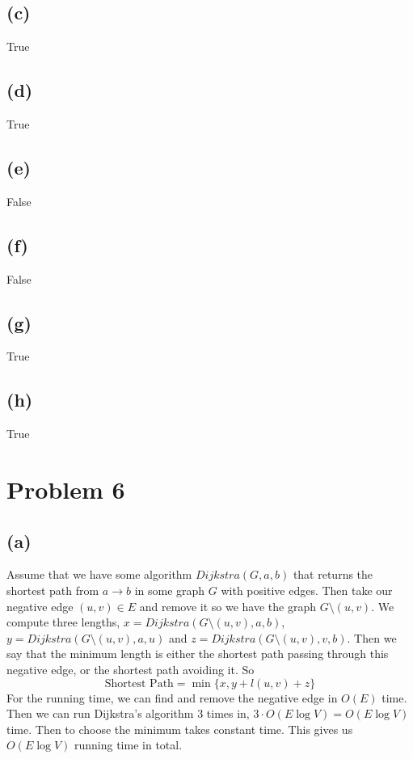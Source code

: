 \documentclass{article}
\theoremstyle{definition}
\begin{document}
\subsection*{(c)}
True
\subsection*{(d)}
True
\subsection*{(e)}
False
\subsection*{(f)}
False
\subsection*{(g)}
True 
\subsection*{(h)}
True
\section*{Problem 6}
\subsection*{(a)}
Assume that we have some algorithm $Dijkstra(G,a,b)$ that returns the shortest path from $a \rightarrow b$ in 
some graph $G$ with positive edges. Then take our negative edge $(u,v) \in E$ and remove it so we have the graph $G \setminus (u,v)$.
We compute three lengths, $x = Dijkstra(G \setminus (u,v), a,b)$, $y = Dijkstra(G \setminus (u,v), a, u)$ and $z = Dijkstra(G \setminus (u,v), v, b)$.
Then we say that the minimum length is either the shortest path passing through this negative edge, or the shortest path avoiding it.
So 
\[
    \text{Shortest Path} = \min\{x,y + l(u,v) + z\}
\]
For the running time, we can find and remove the negative edge in $O(E)$ time. Then we can run Dijkstra's algorithm 3 times in,
$3 \cdot O(E \log V) = O(E \log V)$ time. Then to choose the minimum takes constant time. This gives us $O(E \log V)$ running time in total.
\end{document}
